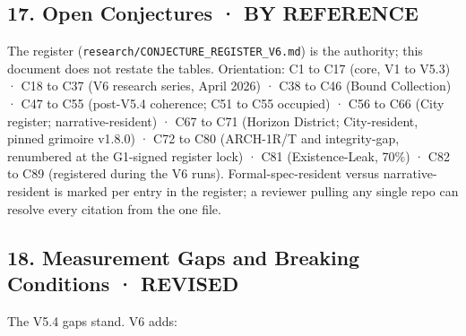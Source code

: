 \documentclass[
  11pt,
]{article}
\begin{document}
\subsection{17. Open Conjectures · BY
REFERENCE}\label{open-conjectures-by-reference}

The register (\texttt{research/CONJECTURE\_REGISTER\_V6.md}) is the
authority; this document does not restate the tables. Orientation: C1 to
C17 (core, V1 to V5.3) · C18 to C37 (V6 research series, April 2026) ·
C38 to C46 (Bound Collection) · C47 to C55 (post-V5.4 coherence; C51 to
C55 occupied) · C56 to C66 (City register; narrative-resident) · C67 to
C71 (Horizon District; City-resident, pinned grimoire v1.8.0) · C72 to
C80 (ARCH-1R/T and integrity-gap, renumbered at the G1-signed register
lock) · C81 (Existence-Leak, 70\%) · C82 to C89 (registered during the
V6 runs). Formal-spec-resident versus narrative-resident is marked per
entry in the register; a reviewer pulling any single repo can resolve
every citation from the one file.

\subsection{18. Measurement Gaps and Breaking Conditions ·
REVISED}\label{measurement-gaps-and-breaking-conditions-revised}

The V5.4 gaps stand. V6 adds:
\end{document}
